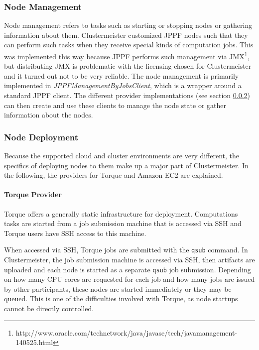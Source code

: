\documentclass[english]{uzhpub}
\begin{document}
\subsubsection{Node Management}

Node management refers to tasks such as starting or stopping nodes or gathering information about them. Clustermeister customized JPPF nodes such that they can perform such tasks when they receive special kinds of computation jobs. This was implemented this way because JPPF performs such management via JMX\footnote{http://www.oracle.com/technetwork/java/javase/tech/javamanagement-140525.html}, but distributing JMX is problematic with the licensing chosen for Clustermeister and it turned out not to be very reliable. The node management is primarily implemented in \textit{JPPFManagementByJobsClient}, which is a wrapper around a standard JPPF client. The different provider implementations (see section \ref{deployment}) can then create and use these clients to manage the node state or gather information about the nodes.

\subsubsection{Node Deployment}
\label{deployment}
Because the supported cloud and cluster environments are very different, the specifics of deploying nodes to them make up a major part of Clustermeister. In the following, the providers for Torque and Amazon EC2 are explained. 

\paragraph{Torque Provider}
\label{implementation-torque}

Torque offers a generally static infrastructure for deployment. Computations tasks are started from a job submission machine that is accessed via SSH and Torque users have SSH access to this machine.

When accessed via SSH, Torque jobs are submitted with the \texttt{qsub} command. In Clustermeister, the job submission machine is accessed via SSH, then artifacts are uploaded and each node is started as a separate \texttt{qsub} job submission. Depending on how many CPU cores are requested for each job and how many jobs are issued by other participants, these nodes are started immediately or they may be queued. This is one of the difficulties involved with Torque, as node startups cannot be directly controlled.
\end{document}
